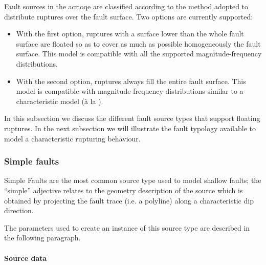 Fault sources in the \gls{acr:oqe} are classified according to the method
adopted to distribute ruptures over the fault surface. Two options are
currently supported:

\begin{itemize}

    \item With the first option, ruptures with a surface lower than the
    whole fault surface are floated so as to cover as much as possible
    homogeneously the fault surface. This model is compatible with all the
    supported magnitude-frequency distributions.

    \item With the second option, ruptures always fill the entire fault
    surface. This model is compatible with magnitude-frequency
    distributions similar to a characteristic model (\`{a} la
    \cite{schwartz1984}).

\end{itemize}

In this subsection we discuss the different fault source types that
support floating ruptures. In the next subsection we will illustrate the fault
typology available to model a characteristic rupturing behaviour.



\subsubsection{Simple faults}
\label{desc_simple_fault}

Simple Faults are the most common source type used to model shallow faults;
the ``simple'' adjective relates to the geometry description of the source
which is obtained by projecting the fault trace (i.e. a polyline) along a
characteristic dip direction.

The parameters used to create an instance of this source type are described
in the following paragraph.

\paragraph{Source data}

